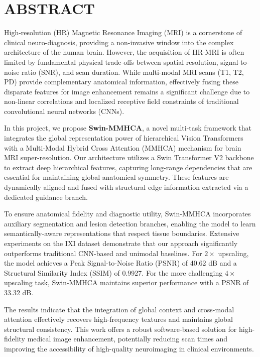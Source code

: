 \chapter*{ABSTRACT}

High-resolution (HR) Magnetic Resonance Imaging (MRI) is a cornerstone of clinical neuro-diagnosis, providing a non-invasive window into the complex architecture of the human brain. However, the acquisition of HR-MRI is often limited by fundamental physical trade-offs between spatial resolution, signal-to-noise ratio (SNR), and scan duration. While multi-modal MRI scans (T1, T2, PD) provide complementary anatomical information, effectively fusing these disparate features for image enhancement remains a significant challenge due to non-linear correlations and localized receptive field constraints of traditional convolutional neural networks (CNNs).

In this project, we propose \textbf{Swin-MMHCA}, a novel multi-task framework that integrates the global representation power of hierarchical Vision Transformers with a Multi-Modal Hybrid Cross Attention (MMHCA) mechanism for brain MRI super-resolution. Our architecture utilizes a Swin Transformer V2 backbone to extract deep hierarchical features, capturing long-range dependencies that are essential for maintaining global anatomical symmetry. These features are dynamically aligned and fused with structural edge information extracted via a dedicated guidance branch. 

To ensure anatomical fidelity and diagnostic utility, Swin-MMHCA incorporates auxiliary segmentation and lesion detection branches, enabling the model to learn semantically-aware representations that respect tissue boundaries. Extensive experiments on the IXI dataset demonstrate that our approach significantly outperforms traditional CNN-based and unimodal baselines. For $2\times$ upscaling, the model achieves a Peak Signal-to-Noise Ratio (PSNR) of 40.62 dB and a Structural Similarity Index (SSIM) of 0.9927. For the more challenging $4\times$ upscaling task, Swin-MMHCA maintains superior performance with a PSNR of 33.32 dB. 

The results indicate that the integration of global context and cross-modal attention effectively recovers high-frequency textures and maintains global structural consistency. This work offers a robust software-based solution for high-fidelity medical image enhancement, potentially reducing scan times and improving the accessibility of high-quality neuroimaging in clinical environments.
